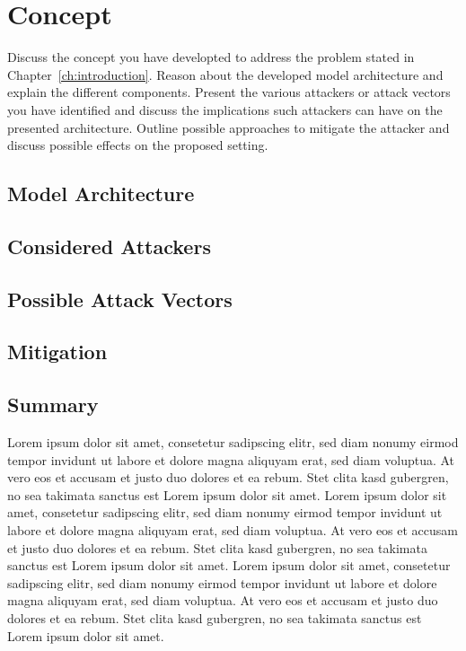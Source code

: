 \chapter{Concept}
\label{ch:concept}

Discuss the concept you have developted to address the problem stated in
Chapter~\ref{ch:introduction}. Reason about the developed model architecture
and explain the different components. Present the various attackers or attack
vectors you have identified and discuss the implications such attackers can
have on the presented architecture. Outline possible approaches to mitigate
the attacker and discuss possible effects on the proposed setting.

\section{Model Architecture}
\label{sec:concept:model_architecture}


\section{Considered Attackers}
\label{sec:concept:considered_attackers}


\section{Possible Attack Vectors}
\label{sec:concept:attack_vectors}


\section{Mitigation}
\label{sec:concept:mitigation}


\section{Summary}
\label{sec:concept:summary}

Lorem ipsum dolor sit amet, consetetur sadipscing elitr, sed diam nonumy eirmod tempor invidunt ut labore et dolore magna aliquyam erat, sed diam voluptua. At vero eos et accusam et justo duo dolores et ea rebum. Stet clita kasd gubergren, no sea takimata sanctus est Lorem ipsum dolor sit amet. Lorem ipsum dolor sit amet, consetetur sadipscing elitr, sed diam nonumy eirmod tempor invidunt ut labore et dolore magna aliquyam erat, sed diam voluptua. At vero eos et accusam et justo duo dolores et ea rebum. Stet clita kasd gubergren, no sea takimata sanctus est Lorem ipsum dolor sit amet. Lorem ipsum dolor sit amet, consetetur sadipscing elitr, sed diam nonumy eirmod tempor invidunt ut labore et dolore magna aliquyam erat, sed diam voluptua. At vero eos et accusam et justo duo dolores et ea rebum. Stet clita kasd gubergren, no sea takimata sanctus est Lorem ipsum dolor sit amet.   

